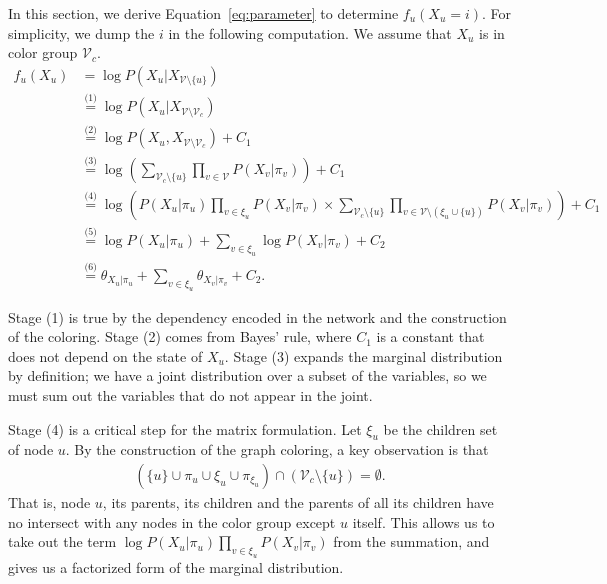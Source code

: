 \documentclass{article} %
\begin{document}
In this section, we derive Equation~\ref{eq:parameter} to determine $f_u(X_u=i)$. For simplicity, we
dump the $i$ in the following computation. We assume that $X_u$ is in color group $\mathcal{V}_c$.
\begin{align}
f_u(X_u) &= \log P(X_u | X_{\mathcal{V} \setminus \{u\}}) \\
    &\stackrel{\text{(1)}}{=} \log P(X_u | X_{\mathcal{V} \setminus \mathcal{V}_c}) \\
    &\stackrel{\text{(2)}}{=} \log P(X_u, X_{\mathcal{V} \setminus \mathcal{V}_c}) + C_1 \\
    &\stackrel{\text{(3)}}{=} \log \left( \sum\limits_{ \mathcal{V}_c \setminus \{u\}}\prod\limits_{v \in \mathcal{V}} P(X_v | \pi_v) \right) + C_1  \\
    &\stackrel{\text{(4)}}{=} \log \left( P(X_u | \pi_u) \prod\limits_{v \in \xi_u} P(X_v | \pi_v) \times \sum\limits_{ \mathcal{V}_c \setminus \{u\}}\prod\limits_{v \in \mathcal{V} \setminus (\xi_u \cup \{u\})} P(X_v | \pi_v) \right) + C_1 \\
    &\stackrel{\text{(5)}}{=} \log P(X_u | \pi_u) + \sum\limits_{v \in \xi_u} \log P(X_v | \pi_v) + C_2 \\
    &\stackrel{\text{(6)}}{=} \theta_{X_u | \pi_u} + \sum\limits_{v \in \xi_u} \theta_{X_v | \pi_v} + C_2.
\end{align}

Stage (1) is true by the dependency encoded in the network and the construction of the coloring.
Stage (2) comes from Bayes' rule, where $C_1$ is a constant that does not depend on the state of
$X_u$. Stage (3) expands the marginal distribution by definition; we have a joint distribution over
a subset of the variables, so we must sum out the variables that do not appear in the joint.

Stage (4) is a critical step for the matrix formulation. Let $\xi_u$ be the children set
of node $u$. By the construction of the graph coloring, a key observation is that
\begin{align}
(\{u\} \cup \pi_u \cup \xi_u \cup \pi_{\xi_u}) \cap (\mathcal{V}_c \setminus \{u\}) = \emptyset. 
\label{ind}
\end{align}
That is, node $u$, its parents, its children and the parents of all its children have no intersect
with any nodes in the color group except $u$ itself. This allows us to take out the term $\log P(X_u
| \pi_u) \prod\limits_{v \in \xi_u} P(X_v | \pi_v)$ from the summation, and gives us a factorized
form of the marginal distribution.
\end{document}
